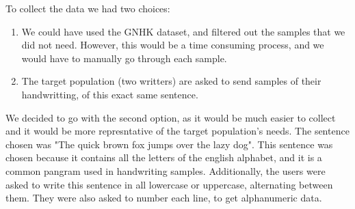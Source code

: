 \documentclass[twoside,a4paper]{article}
\begin{document}
To collect the data we had two choices: 
\begin{enumerate}
  \item We could have used the GNHK dataset, and filtered out the samples that we did not need. However, this would be a time consuming process, and we would have to manually go through each sample.
  \item The target population (two writters) are asked to send samples of their handwritting, of this exact same sentence. 
\end{enumerate}

We decided to go with the second option, as it would be much easier to collect and it would be more represntative of the target population's needs.
The sentence chosen was "The quick brown fox jumps over the lazy dog". This sentence was chosen because it contains all the letters of the english alphabet, and it is a common pangram used in handwriting samples.
Additionally, the users were asked to write this sentence in all lowercase or uppercase, alternating between them. They were also asked to number each line, to get alphanumeric data.
\end{document}
